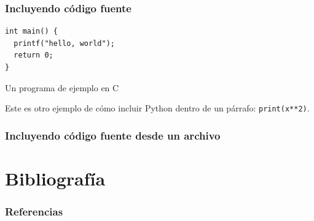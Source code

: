 \begin{frame}[fragile] %
\frametitle{Incluyendo código fuente}
\begin{listing}
\begin{verbatim}
int main() {
  printf("hello, world");
  return 0;
}
\end{verbatim}
\caption{Un programa de ejemplo en C}\label{lst:hello}
\end{listing}

Este es otro ejemplo de cómo incluir Python dentro de un párrafo: \texttt{print(x**2)}.

\end{frame}

\begin{frame}[fragile] %
\frametitle{Incluyendo código fuente desde un archivo}
\end{frame}

\section{Bibliografía}
\nocite{Ross2012}
\begin{frame}[allowframebreaks]
\frametitle{Referencias}
\printbibliography
\end{frame}
